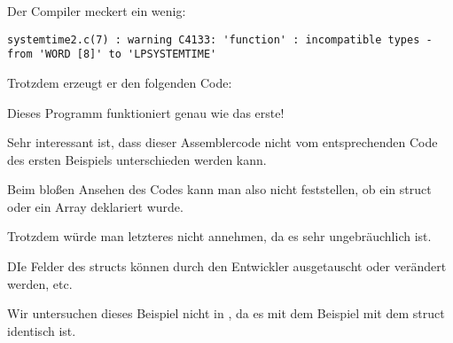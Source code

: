 
Der Compiler meckert ein wenig:

\begin{lstlisting}
systemtime2.c(7) : warning C4133: 'function' : incompatible types - from 'WORD [8]' to 'LPSYSTEMTIME'
\end{lstlisting}

Trotzdem erzeugt er den folgenden Code:


Dieses Programm funktioniert genau wie das erste!

Sehr interessant ist, dass dieser Assemblercode nicht vom entsprechenden Code des ersten Beispiels unterschieden werden
kann.

Beim bloßen Ansehen des Codes kann man also nicht feststellen, ob ein struct oder ein Array deklariert wurde.

Trotzdem würde man letzteres nicht annehmen, da es sehr ungebräuchlich ist.

DIe Felder des structs können durch den Entwickler ausgetauscht oder verändert werden, etc.

Wir untersuchen dieses Beispiel nicht in \olly, da es mit dem Beispiel mit dem struct identisch ist.

